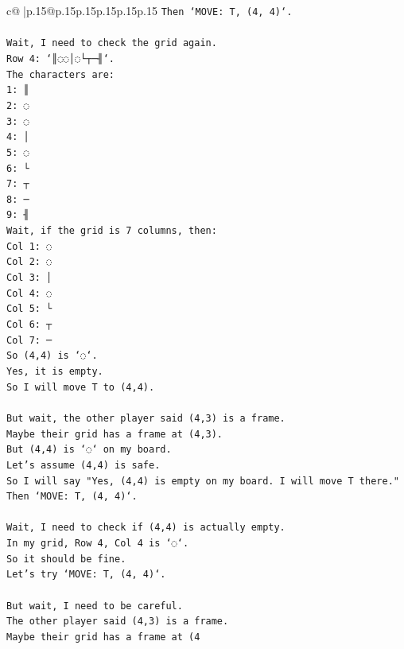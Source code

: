 \documentclass{article}
\begin{document}
{\begin{supertabular}{c@{$\;$}|p{.15\linewidth}@{}p{.15\linewidth}p{.15\linewidth}p{.15\linewidth}p{.15\linewidth}p{.15\linewidth}}
{{{\texttt{Then `MOVE: T, (4, 4)`.} \\
\\ 
\texttt{Wait, I need to check the grid again.} \\
\texttt{Row 4: `║◌◌│◌└┬─╢`.} \\
\texttt{The characters are:} \\
\texttt{1: ║} \\
\texttt{2: ◌} \\
\texttt{3: ◌} \\
\texttt{4: │} \\
\texttt{5: ◌} \\
\texttt{6: └} \\
\texttt{7: ┬} \\
\texttt{8: ─} \\
\texttt{9: ╢} \\
\texttt{Wait, if the grid is 7 columns, then:} \\
\texttt{Col 1: ◌} \\
\texttt{Col 2: ◌} \\
\texttt{Col 3: │} \\
\texttt{Col 4: ◌} \\
\texttt{Col 5: └} \\
\texttt{Col 6: ┬} \\
\texttt{Col 7: ─} \\
\texttt{So (4,4) is `◌`.} \\
\texttt{Yes, it is empty.} \\
\texttt{So I will move T to (4,4).} \\
\\ 
\texttt{But wait, the other player said (4,3) is a frame.} \\
\texttt{Maybe their grid has a frame at (4,3).} \\
\texttt{But (4,4) is `◌` on my board.} \\
\texttt{Let's assume (4,4) is safe.} \\
\texttt{So I will say "Yes, (4,4) is empty on my board. I will move T there."} \\
\texttt{Then `MOVE: T, (4, 4)`.} \\
\\ 
\texttt{Wait, I need to check if (4,4) is actually empty.} \\
\texttt{In my grid, Row 4, Col 4 is `◌`.} \\
\texttt{So it should be fine.} \\
\texttt{Let's try `MOVE: T, (4, 4)`.} \\
\\ 
\texttt{But wait, I need to be careful.} \\
\texttt{The other player said (4,3) is a frame.} \\
\texttt{Maybe their grid has a frame at (4} \\
            }
        }
    }
     \\ \\


\end{supertabular}}
\end{document}
